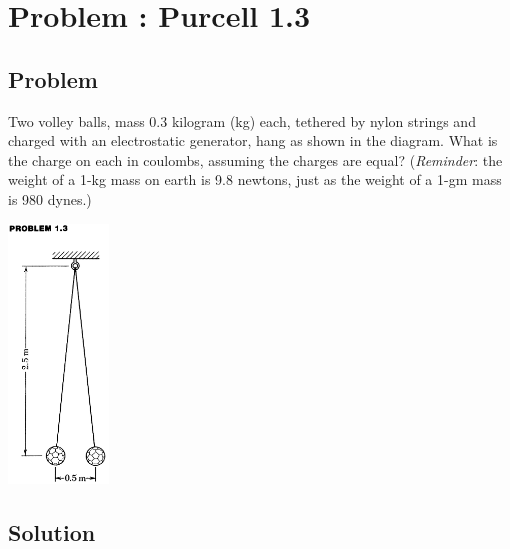 \documentclass[solutions]{esg8022pset}
\date{\today }
\begin{document}
\section{Problem \thesection: Purcell 1.3}
\subsection{Problem}
  Two volley balls, mass 0.3 kilogram (kg) each, tethered by nylon strings and charged with an electrostatic generator, hang as shown in the diagram. What is the charge on each in coulombs, assuming the charges are equal? (\emph{Reminder}: the weight of a 1-kg mass on earth is 9.8 newtons, just as the weight of a 1-gm mass is 980 dynes.)
  \begin{center}\includegraphics[width=0.2\textwidth]{ps01_1}\end{center}
\subsection{Solution}
\end{document}
